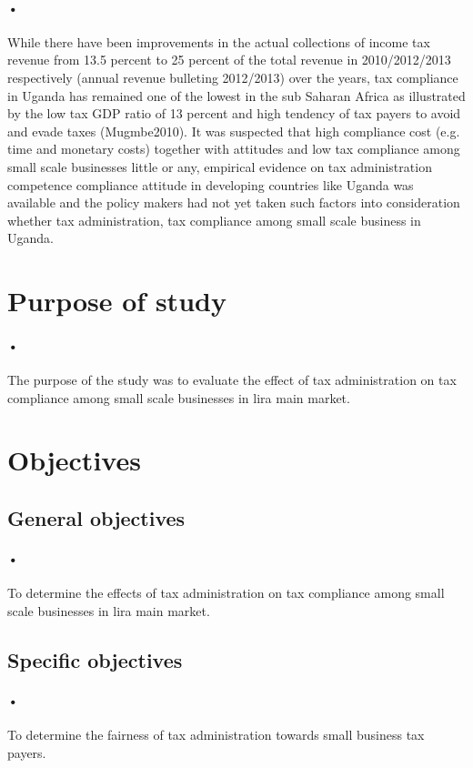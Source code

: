 \documentclass[12pt]{article}
\begin{document}
\paragraph{•}While there have been improvements in the actual collections of income tax revenue from 13.5 percent to 25 percent of the total revenue in 2010/2012/2013 respectively (annual revenue bulleting 2012/2013) over the years, tax compliance in Uganda has remained one of the lowest in the sub Saharan Africa as illustrated by the low tax GDP ratio of 13 percent and high tendency of tax payers to avoid and evade taxes (Mugmbe2010). It was suspected that high compliance cost (e.g. time and monetary costs) together with attitudes and low tax compliance among small scale businesses little or any, empirical evidence on tax administration competence compliance attitude in developing countries like Uganda was available and the policy makers had not yet taken such factors into consideration whether tax administration, tax compliance among small scale business in Uganda.

\section{Purpose of study}
\paragraph{•}The purpose of the study was to evaluate the effect of tax administration on tax compliance among small scale businesses in lira main market.
\section{Objectives}
\subsection{General objectives }
\paragraph{•}To determine the effects of tax administration on tax compliance among small scale businesses in lira main market.
\subsection{Specific objectives }
\paragraph{•}To determine the fairness of tax administration towards small business tax payers.
\end{document}
